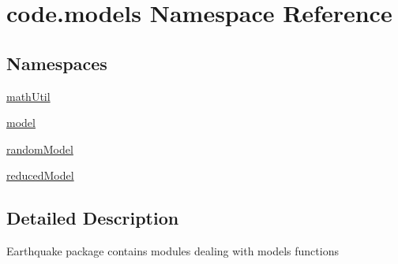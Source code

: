 \hypertarget{namespacecode_1_1models}{}\section{code.\+models Namespace Reference}
\label{namespacecode_1_1models}
\subsection*{Namespaces}
\begin{DoxyCompactItemize}
\item 
 \hyperlink{namespacecode_1_1models_1_1math_util}{math\+Util}
\item 
 \hyperlink{namespacecode_1_1models_1_1model}{model}
\item 
 \hyperlink{namespacecode_1_1models_1_1random_model}{random\+Model}
\item 
 \hyperlink{namespacecode_1_1models_1_1reduced_model}{reduced\+Model}
\end{DoxyCompactItemize}


\subsection{Detailed Description}
\begin{DoxyVerb}Earthquake package contains modules dealing with models functions
\end{DoxyVerb}
 